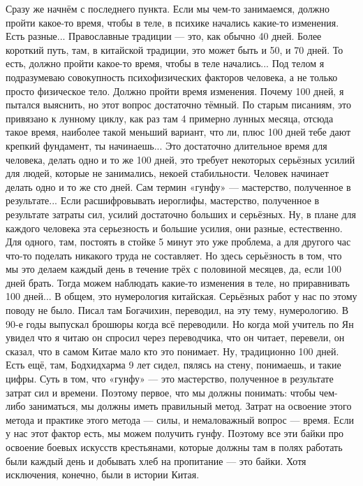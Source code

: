 \T
Сразу же начнём с последнего пункта. Если мы чем-то занимаемся, должно пройти какое-то время,
чтобы в теле, в
психике начались какие-то изменения. Есть разные... Православные традиции --- это, как обычно
40 дней. Более
короткий путь, там, в китайской традиции, это может быть и 50, и 70 дней.\hfil\break
\indent
То есть, должно пройти какое-то время, чтобы в теле начались... Под телом я подразумеваю
совокупность
психофизических факторов человека, а не только просто физическое тело. Должно пройти время
изменения. Почему 100
дней, я пытался выяснить, но этот вопрос достаточно тёмный.\hfil\break
\indent
По старым писаниям, это привязано к лунному циклу, как раз там 4 примерно лунных месяца,
отсюда такое время,
наиболее такой меньший вариант, что ли, плюс 100 дней тебе дают крепкий фундамент, ты
начинаешь... Это достаточно
длительное время для человека, делать одно и то же 100 дней, это требует некоторых серьёзных
усилий для людей,
которые не занимались, некоей стабильности. Человек начинает делать одно и то же сто
дней.
\hfil\break
\indent
Сам термин «гунфу» --- мастерство, полученное в результате... Если расшифровывать иероглифы,
мастерство, полученное в
результате затраты сил, усилий достаточно больших и серьёзных. Ну, в плане для каждого
человека эта серьезность и
большие усилия, они разные, естественно. Для одного, там, постоять в стойке 5 минут это уже
проблема, а для другого час
что-то поделать никакого труда не составляет. Но здесь серьёзность в том, что мы это делаем
каждый день в течение
трёх с половиной месяцев, да, если 100 дней брать. Тогда можем наблюдать какие-то
изменения в теле, но
приравнивать 100 дней... В общем, это нумерология китайская. Серьёзных работ у нас по этому поводу
не было. Писал там
Богачихин, переводил, на эту тему, нумерологию. В 90-е годы выпускал брошюры когда всё переводили.
Но когда мой
учитель по Ян увидел что я читаю он спросил через переводчика, что он читает, перевели, он
сказал, что в самом Китае
мало кто это понимает.\hfil\break
\indent
Ну, традиционно 100 дней. Есть ещё, там, Бодхидхарма 9 лет сидел, пялясь на стену, понимаешь, и
такие цифры. Суть в
том, что «гунфу» --- это мастерство, полученное в результате затрат сил и времени.
Поэтому первое, что мы
должны понимать: чтобы чем-либо заниматься, мы должны иметь правильный метод.\hfil\break
\indent
Затрат на освоение этого метода и практике этого метода --- силы, и немаловажный вопрос ---
время. Если у нас этот
фактор есть, мы можем получить гунфу. Поэтому все эти байки про освоение боевых искусств
крестьянами, которые
должны там в полях работать были каждый день и добывать хлеб на пропитание --- это
байки.\hfil\break
\indent
Хотя исключения, конечно, были в истории Китая.

